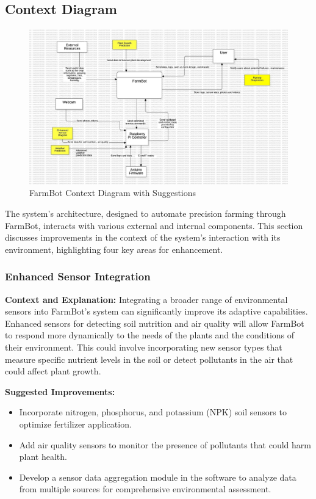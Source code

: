 \subsection{Context Diagram}
\begin{figure}[H]
    \centering
\includegraphics[scale=0.34]{./Figures/farmbot_context_diagram_suggested.jpg}
\caption{FarmBot Context Diagram with Suggestions}
\end{figure}


The system's architecture, designed to automate precision farming through FarmBot, interacts with various external and internal components. This section discusses improvements in the context of the system's interaction with its environment, highlighting four key areas for enhancement.

\subsubsection{Enhanced Sensor Integration}
\textbf{Context and Explanation:} Integrating a broader range of environmental sensors into FarmBot's system can significantly improve its adaptive capabilities. Enhanced sensors for detecting soil nutrition and air quality will allow FarmBot to respond more dynamically to the needs of the plants and the conditions of their environment. This could involve incorporating new sensor types that measure specific nutrient levels in the soil or detect pollutants in the air that could affect plant growth.

\textbf{Suggested Improvements:}
\begin{itemize}
    \item Incorporate nitrogen, phosphorus, and potassium (NPK) soil sensors to optimize fertilizer application.
    \item Add air quality sensors to monitor the presence of pollutants that could harm plant health.
    \item Develop a sensor data aggregation module in the software to analyze data from multiple sources for comprehensive environmental assessment.
\end{itemize}

